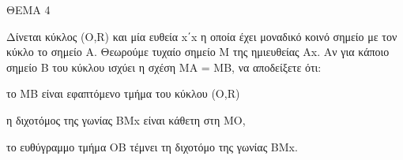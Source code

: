
ΘΕΜΑ 4

Δίνεται κύκλος (Ο,R) και μία ευθεία x΄x η οποία έχει μοναδικό κοινό σημείο με τον κύκλο το σημείο Α. Θεωρούμε τυχαίο σημείο Μ της ημιευθείας Αx. Aν για κάποιο σημείο Β του κύκλου ισχύει η σχέση ΜΑ = ΜΒ, να αποδείξετε ότι:

\begin{alist}
\item το ΜΒ είναι εφαπτόμενο τμήμα του κύκλου (Ο,R) 

\item η διχοτόμος της γωνίας ΒΜx είναι κάθετη στη ΜΟ, 

\item το ευθύγραμμο τμήμα ΟΒ τέμνει τη διχοτόμο της γωνίας ΒΜx. 
\end{alist}
